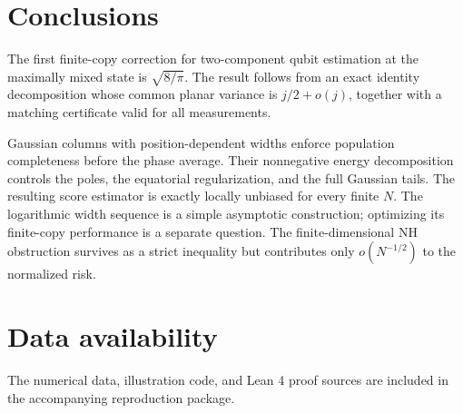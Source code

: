 \documentclass[aps,pra,reprint,superscriptaddress]{revtex4-2}
\theoremstyle{remark}
\begin{document}
\section{Conclusions}\label{sec:conclusions}

The first finite-copy correction for two-component qubit
estimation at the maximally mixed state is $\sqrt{8/\pi}$.
The result follows from an exact identity decomposition whose
common planar variance is $j/2+o(j)$, together with a matching
certificate valid for all measurements.

Gaussian columns with position-dependent widths enforce
population completeness before the phase average. Their
nonnegative energy decomposition controls the poles, the
equatorial regularization, and the full Gaussian tails.
The resulting score estimator is exactly locally unbiased for
every finite $N$. The logarithmic width sequence is a simple
asymptotic construction; optimizing its finite-copy performance
is a separate question. The finite-dimensional NH obstruction
survives as a strict inequality but contributes only
$o(N^{-1/2})$ to the normalized risk.

\section*{Data availability}
The numerical data, illustration code, and Lean 4 proof sources
are included in the accompanying reproduction package.

\begin{acknowledgments}
\end{acknowledgments}

\appendix
\end{document}
